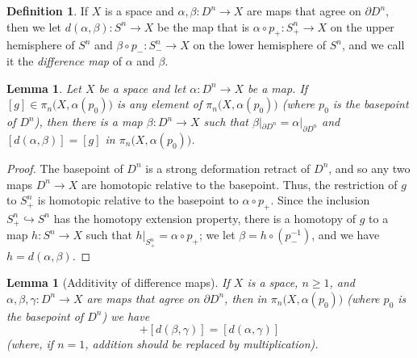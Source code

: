 \documentclass[12pt]{amsart}
\numberwithin{equation}{section}
\theoremstyle{slplain}
\newtheorem{lem}[equation]{Lemma}
\theoremstyle{definition}
\newtheorem{defn}[equation]{Definition} %
\theoremstyle{remark}
\newcommand{\rest}[1]{|_{#1}}
\newcommand{\bdry}{\partial}
\begin{document}
\begin{defn}
  \label{def:diff}
  If $X$ is a space and $\alpha,\beta\colon D^{n} \to X$ are maps that
  agree on $\bdry D^{n}$, then we let $d(\alpha,\beta)\colon S^{n} \to
  X$ be the map that is $\alpha \circ p_{+}\colon S^{n}_{+} \to X$ on
  the upper hemisphere of $S^{n}$ and $\beta \circ p_{-}\colon
  S^{n}_{-} \to X$ on the lower hemisphere of $S^{n}$, and we call it
  the \emph{difference map} of $\alpha$ and $\beta$.
\end{defn}

\begin{lem}
  \label{lem:any}
  Let $X$ be a space and let $\alpha\colon D^{n} \to X$ be a map.  If
  $[g] \in \pi_{n}\bigl(X, \alpha(p_{0})\bigr)$ is any element of
  $\pi_{n}\bigl(X, \alpha(p_{0})\bigr)$ (where $p_{0}$ is the
  basepoint of $D^{n}$), then there is a map $\beta\colon D^{n} \to X$
  such that $\beta\rest{\bdry D^{n}} = \alpha\rest{\bdry D^{n}}$ and
  $[d(\alpha,\beta)] = [g]$ in $\pi_{n}\bigl(X, \alpha(p_{0})\bigr)$.
\end{lem}

\begin{proof}
  The basepoint of $D^{n}$ is a strong deformation retract of $D^{n}$,
  and so any two maps $D^{n} \to X$ are homotopic relative to the
  basepoint.  Thus, the restriction of $g$ to $S^{n}_{+}$ is homotopic
  relative to the basepoint to $\alpha \circ p_{+}$.  Since the
  inclusion $S^{n}_{+} \hookrightarrow S^{n}$ has the homotopy
  extension property, there is a homotopy of $g$ to a map $h\colon
  S^{n} \to X$ such that $h\rest{S^{n}_{+}} = \alpha \circ p_{+}$; we
  let $\beta = h \circ (p_{-}^{-1})$, and we have $h =
  d(\alpha,\beta)$.
\end{proof}

\begin{lem}[Additivity of difference maps]
  \label{lem:add}
  If $X$ is a space, $n \ge 1$, and $\alpha,\beta,\gamma\colon D^{n}
  \to X$ are maps that agree on $\bdry D^{n}$, then in
  $\pi_{n}\bigl(X, \alpha(p_{0})\bigr)$ (where $p_{0}$ is the
  basepoint of $D^{n}$) we have
  \begin{displaymath}
    [d(\alpha,\beta)] + [d(\beta,\gamma)] = [d(\alpha,\gamma)]
  \end{displaymath}
  (where, if $n = 1$, addition should be replaced by multiplication).
\end{lem}
\end{document}
